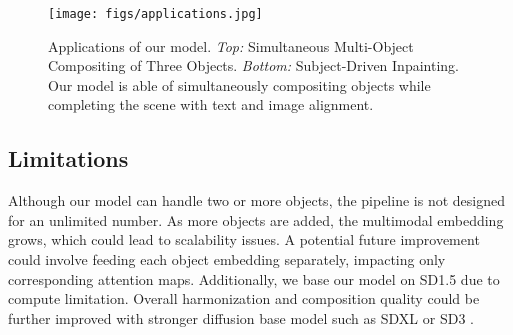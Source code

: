 

\begin{figure}[t]
    \centering
    \texttt{[image: figs/applications.jpg]}
    \caption{Applications of our model. \textit{Top:} Simultaneous Multi-Object Compositing of Three Objects. \textit{Bottom:} Subject-Driven Inpainting. Our model is able of simultaneously compositing objects while completing the scene with text and image alignment.} %

    \label{fig:applications}
    \vspace{-6mm}
\end{figure}
\vspace{-2mm}
\subsection{Limitations}

Although our model can handle two or more objects, the pipeline is not designed for an unlimited number. As more objects are added, the multimodal embedding grows, which could lead to scalability issues. A potential future improvement could involve feeding each object embedding separately, impacting only corresponding attention maps. Additionally, we base our model on SD1.5 due to compute limitation. Overall harmonization and composition quality could be further improved with stronger diffusion base model such as SDXL \cite{podell2023sdxl} or SD3 \cite{esser2024scaling}.


